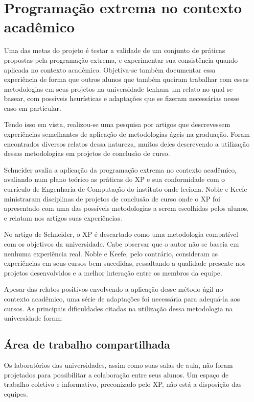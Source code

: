 \documentclass[a4paper,12pt,font=plain,header=plain]{abnt}
\begin{document}
	\section{Programação extrema no contexto acadêmico}
	Uma das metas do projeto é testar a validade de um conjunto de práticas propostas pela programação extrema, e experimentar sua consistência quando aplicada no contexto acadêmico. Objetiva-se também documentar essa experiência de forma que outros alunos que também queiram trabalhar com essas metodologias em seus projetos na universidade tenham um relato no qual se basear, com possíveis heurísticas e adaptações que se fizeram necessárias nesse caso em particular.
	
	Tendo isso em vista, realizou-se uma pesquisa por artigos que descrevessem experiências semelhantes de aplicação de metodologias ágeis na graduação. Foram encontrados diversos relatos dessa natureza, muitos deles descrevendo a utilização dessas metodologias em projetos de conclusão de curso.
	
	Schneider\cite{schneider03} avalia a aplicação da programação extrema no contexto acadêmico, avaliando num plano teórico as práticas do XP e sua conformidade com o currículo de Engenharia de Computação do instituto onde leciona. Noble\cite{noble04} e Keefe\cite{keefe04} ministraram disciplinas de projetos de conclusão de curso onde o XP foi apresentado com uma das possíveis metodologias a serem escolhidas pelos alunos, e relatam nos artigos suas experiências.
	
	No artigo de Schneider, o XP é descartado como uma metodologia compatível com os objetivos da universidade. Cabe observar que o autor não se baseia em nenhuma experiência real. Noble e Keefe, pelo contrário, consideram as experiências em seus cursos bem sucedidas, ressaltando a qualidade presente nos projetos desenvolvidos e a melhor interação entre os membros da equipe.
	
	Apesar das relatos positivos envolvendo a aplicação desse método ágil no contexto acadêmico, uma série de adaptações foi necessária para adequá-la aos cursos. As principais dificuldades citadas na utilização dessa metodologia na universidade foram:
	
	\subsection{Área de trabalho compartilhada}
		Os laboratórios das universidades, assim como suas salas de aula, não foram projetados para possibilitar a colaboração entre seus alunos. Um espaço de trabalho coletivo e informativo, preconizado pelo XP, não está a disposição das equipes.
	
\end{document}
